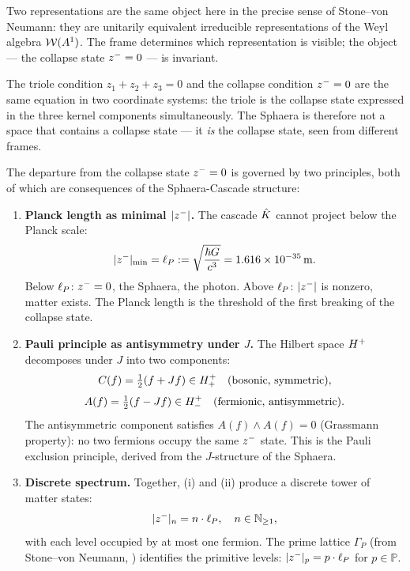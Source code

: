 \begin{remark}
Two representations are the same object here in the precise sense of
Stone--von Neumann: they are unitarily equivalent irreducible
representations of the Weyl algebra $\mathcal{W}(A^1)$.
The frame determines which representation is visible; the object ---
the collapse state $z^-=0$ --- is invariant.

The triole condition $z_1+z_2+z_3=0$ and the collapse condition
$z^-=0$ are the same equation in two coordinate systems: the triole
is the collapse state expressed in the three kernel components
simultaneously.
The Sphaera is therefore not a space that contains a collapse state ---
it \emph{is} the collapse state, seen from different frames.
\end{remark}

\begin{theorem}
\label{thm:origin}
The departure from the collapse state $z^-=0$ is governed by two
principles, both of which are consequences of the Sphaera-Cascade
structure:
\begin{enumerate}[label=(\roman*)]
  \item \textbf{Planck length as minimal $|z^-|$.}
        The cascade $\hat{K}$ cannot project below the Planck scale:
        \[
          |z^-|_{\min} = \ell_P := \sqrt{\frac{\hbar G}{c^3}}
          = 1.616\times10^{-35}\,\mathrm{m}.
        \]
        Below $\ell_P$: $z^-=0$, the Sphaera, the photon.
        Above $\ell_P$: $|z^-|$ is nonzero, matter exists.
        The Planck length is the threshold of the first breaking of the
        collapse state.
  \item \textbf{Pauli principle as antisymmetry under $J$.}
        The Hilbert space $H^+$ decomposes under $J$ into two
        components:
        \[
          C(f) = \tfrac{1}{2}(f+Jf)\in H^+_+
          \quad\text{(bosonic, symmetric)},
        \]
        \[
          A(f) = \tfrac{1}{2}(f-Jf)\in H^+_-
          \quad\text{(fermionic, antisymmetric)}.
        \]
        The antisymmetric component satisfies $A(f)\wedge A(f)=0$
        (Grassmann property): no two fermions occupy the same $z^-$
        state.
        This is the Pauli exclusion principle, derived from the
        $J$-structure of the Sphaera.
  \item \textbf{Discrete spectrum.}
        Together, (i) and (ii) produce a discrete tower of matter states:
        \[
          |z^-|_n = n\cdot\ell_P,\quad n\in\mathbb{N}_{\geq1},
        \]
        with each level occupied by at most one fermion.
        The prime lattice $\Gamma_P$ (from Stone--von Neumann,
        \cite{brendecke2026rh}) identifies the primitive levels:
        $|z^-|_p = p\cdot\ell_P$ for $p\in\mathbb{P}$.
\end{enumerate}
\end{theorem}

